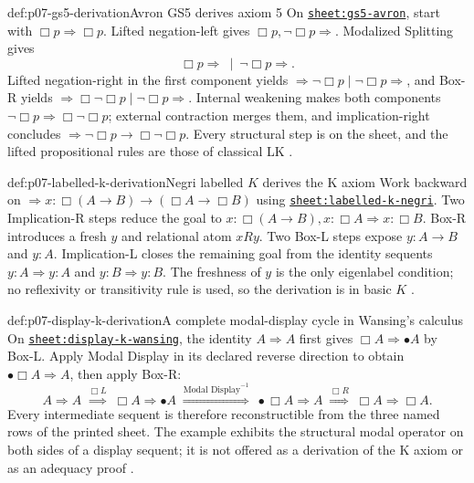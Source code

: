 \begin{hbexample}{def:p07-gs5-derivation}{Avron GS5 derives axiom 5}
On \hyperref[sheet:gs5-avron]{\texttt{sheet:gs5-avron}}, start with
\(\Box p\Rightarrow\Box p\). Lifted negation-left gives
\(\Box p,\neg\Box p\Rightarrow\). Modalized Splitting gives
\[
 \Box p\Rightarrow\ \mid\ \neg\Box p\Rightarrow.
\]
Lifted negation-right in the first component yields
\(\Rightarrow\neg\Box p\mid\neg\Box p\Rightarrow\), and Box-R yields
\(\Rightarrow\Box\neg\Box p\mid\neg\Box p\Rightarrow\).
Internal weakening makes both components
\(\neg\Box p\Rightarrow\Box\neg\Box p\); external contraction merges them,
and implication-right concludes
\(\Rightarrow\neg\Box p\to\Box\neg\Box p\). Every structural step is on the
sheet, and the lifted propositional rules are those of classical LK
\cite{Avron1996}.
\end{hbexample}

\begin{hbexample}{def:p07-labelled-k-derivation}{Negri labelled \(K\) derives the K axiom}
Work backward on
\(\Rightarrow x:\Box(A\to B)\to(\Box A\to\Box B)\) using
\hyperref[sheet:labelled-k-negri]{\texttt{sheet:labelled-k-negri}}. Two
Implication-R steps reduce the goal to
\(x:\Box(A\to B),x:\Box A\Rightarrow x:\Box B\). Box-R introduces a fresh
\(y\) and relational atom \(xRy\). Two Box-L steps expose
\(y:A\to B\) and \(y:A\). Implication-L closes the remaining goal from the
identity sequents \(y:A\Rightarrow y:A\) and
\(y:B\Rightarrow y:B\). The freshness of \(y\) is the only eigenlabel
condition; no reflexivity or transitivity rule is used, so the derivation is in
basic \(K\) \cite{Negri2005}.
\end{hbexample}

\begin{hbexample}{def:p07-display-k-derivation}{A complete modal-display cycle in Wansing's calculus}
On \hyperref[sheet:display-k-wansing]{\texttt{sheet:display-k-wansing}}, the
identity \(A\Rightarrow A\) first gives
\(\Box A\Rightarrow\bullet A\) by Box-L.  Apply Modal Display in its declared
reverse direction to obtain
\(\bullet\Box A\Rightarrow A\), then apply Box-R:
\[
 A\Rightarrow A
 \;\overset{\Box L}{\Longrightarrow}\;
 \Box A\Rightarrow\bullet A
 \;\overset{\text{Modal Display}^{-1}}{\Longrightarrow}\;
 \bullet\Box A\Rightarrow A
 \;\overset{\Box R}{\Longrightarrow}\;
 \Box A\Rightarrow\Box A.
\]
Every intermediate sequent is therefore reconstructible from the three named
rows of the printed sheet.  The example exhibits the structural modal operator
on both sides of a display sequent; it is not offered as a derivation of the K
axiom or as an adequacy proof \cite{Wansing1994}.
\end{hbexample}

